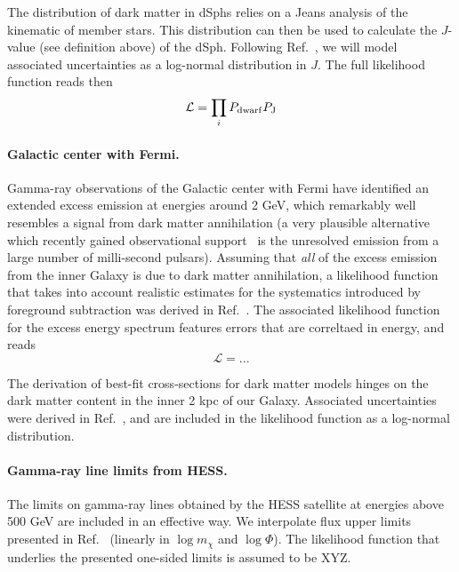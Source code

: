 The distribution of dark matter in dSphs relies on a Jeans analysis of the
kinematic of member stars.  This distribution can then be used to calculate the
$J$-value (see definition above) of the dSph.  Following
Ref.~\cite{FermiDwarfs}, we will model associated uncertainties as a log-normal
distribution in $J$.  The full likelihood function reads then
%
\begin{equation}
  \mathcal{L} = \prod_i P_{\rm dwarf} P_{\rm J}
\end{equation}
%

\paragraph{Galactic center with Fermi.}
Gamma-ray observations of the Galactic center with Fermi have identified an
extended excess emission at energies around 2 GeV, which remarkably well
resembles a signal from dark matter annihilation (a very plausible alternative
which recently gained observational support~\cite{123} is the
unresolved emission from a large number of milli-second pulsars).  Assuming
that \emph{all} of the excess emission from the inner Galaxy is due to dark
matter annihilation, a likelihood function that takes into account realistic
estimates for the systematics introduced by foreground subtraction was derived
in Ref.~\cite{123}.  The associated likelihood function for the excess energy
spectrum features errors that are correltaed in energy, and reads
\begin{equation}
  \mathcal{L} = ...
\end{equation}

The derivation of best-fit cross-sections for dark matter models hinges on the
dark matter content in the inner 2 kpc of our Galaxy.  Associated uncertainties
were derived in Ref.~\cite{123}, and are included in the likelihood function as
a log-normal distribution.

\paragraph{Gamma-ray line limits from HESS.}

The limits on gamma-ray lines obtained by the HESS satellite at energies above
500 GeV are included in an effective way.  We interpolate flux upper limits
presented in Ref.~\cite{123} (linearly in $\log m_\chi$ and $\log \Phi$).  The
likelihood function that underlies the presented one-sided limits is assumed to
be XYZ.



